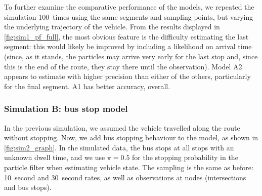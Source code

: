 To further examine the comparative performance of the models, we repeated the simulation 100~times using the same segments and sampling points, but varying the underlying trajectory of the vehicle. From the results displayed in \cref{fig:sim1_pf_full}, the most obvious feature is the difficulty estimating the last segment: this would likely be improved by including a likelihood on arrival time (since, as it stands, the particles may arrive very early for the last stop and, since this is the end of the route, they stay there until the observation). Model A2 appears to estimate with higher precision than either of the others, particularly for the final segment. A1 has better accuracy, overall.



\subsubsection{Simulation B: bus stop model}
\label{sec:vehicle_sim_B}

In the previous simulation, we assumed the vehicle travelled along the route without stopping. Now, we add bus stopping behaviour to the model, as shown in \cref{fig:sim2_graph}. In the simulated data, the bus stops at all stops with an unknown dwell time, and we use $\pi=0.5$ for the stopping probability in the particle filter when estimating vehicle state. The sampling is the same as before: 10~second and 30~second rates, as well as observations at nodes (intersections and bus stops).






